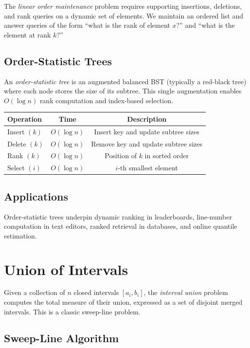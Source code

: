 The \emph{linear order maintenance} problem requires supporting insertions, deletions, and rank queries on a dynamic set of elements. We maintain an ordered list and answer queries of the form ``what is the rank of element $x$?'' and ``what is the element at rank $k$?''

\subsection{Order-Statistic Trees}

An \emph{order-statistic tree} is an augmented balanced BST (typically a red-black tree) where each node stores the size of its subtree. This single augmentation enables $O(\log n)$ rank computation and index-based selection.

\begin{center}
\begin{tabular}{lcc}
\toprule
Operation & Time & Description \\
\midrule
Insert $(k)$ & $O(\log n)$ & Insert key and update subtree sizes \\
Delete $(k)$ & $O(\log n)$ & Remove key and update subtree sizes \\
Rank $(k)$ & $O(\log n)$ & Position of $k$ in sorted order \\
Select $(i)$ & $O(\log n)$ & $i$-th smallest element \\
\bottomrule
\end{tabular}
\end{center}

\subsection{Applications}

Order-statistic trees underpin dynamic ranking in leaderboards, line-number computation in text editors, ranked retrieval in databases, and online quantile estimation.

\section{Union of Intervals}
\label{sec:union-intervals}

Given a collection of $n$ closed intervals $[a_i, b_i]$, the \emph{interval union} problem computes the total measure of their union, expressed as a set of disjoint merged intervals. This is a classic sweep-line problem.

\subsection{Sweep-Line Algorithm}

